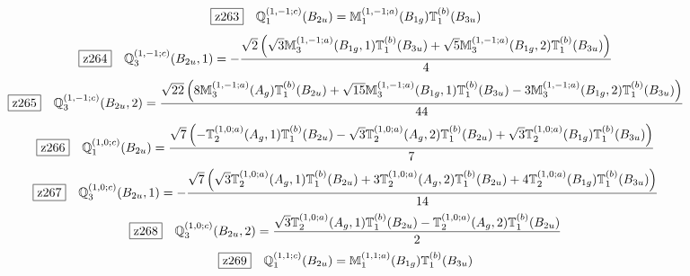 \documentclass[fleqn,10pt,landscape]{jsarticle}
\begin{document}
\begin{dmath*}
\hspace*{3mm}\fbox{z263}\quad \mathbb{Q}_{1}^{(1,-1;c)}(B_{2u})=\mathbb{M}_{1}^{(1,-1;a)}(B_{1g}) \mathbb{T}_{1}^{(b)}(B_{3u})
\end{dmath*}
\begin{dmath*}
\hspace*{3mm}\fbox{z264}\quad \mathbb{Q}_{3}^{(1,-1;c)}(B_{2u},1)=- \frac{\sqrt{2} \left(\sqrt{3} \mathbb{M}_{3}^{(1,-1;a)}(B_{1g},1) \mathbb{T}_{1}^{(b)}(B_{3u}) + \sqrt{5} \mathbb{M}_{3}^{(1,-1;a)}(B_{1g},2) \mathbb{T}_{1}^{(b)}(B_{3u})\right)}{4}
\end{dmath*}
\begin{dmath*}
\hspace*{3mm}\fbox{z265}\quad \mathbb{Q}_{3}^{(1,-1;c)}(B_{2u},2)=\frac{\sqrt{22} \left(8 \mathbb{M}_{3}^{(1,-1;a)}(A_{g}) \mathbb{T}_{1}^{(b)}(B_{2u}) + \sqrt{15} \mathbb{M}_{3}^{(1,-1;a)}(B_{1g},1) \mathbb{T}_{1}^{(b)}(B_{3u}) - 3 \mathbb{M}_{3}^{(1,-1;a)}(B_{1g},2) \mathbb{T}_{1}^{(b)}(B_{3u})\right)}{44}
\end{dmath*}
\begin{dmath*}
\hspace*{3mm}\fbox{z266}\quad \mathbb{Q}_{1}^{(1,0;c)}(B_{2u})=\frac{\sqrt{7} \left(- \mathbb{T}_{2}^{(1,0;a)}(A_{g},1) \mathbb{T}_{1}^{(b)}(B_{2u}) - \sqrt{3} \mathbb{T}_{2}^{(1,0;a)}(A_{g},2) \mathbb{T}_{1}^{(b)}(B_{2u}) + \sqrt{3} \mathbb{T}_{2}^{(1,0;a)}(B_{1g}) \mathbb{T}_{1}^{(b)}(B_{3u})\right)}{7}
\end{dmath*}
\begin{dmath*}
\hspace*{3mm}\fbox{z267}\quad \mathbb{Q}_{3}^{(1,0;c)}(B_{2u},1)=- \frac{\sqrt{7} \left(\sqrt{3} \mathbb{T}_{2}^{(1,0;a)}(A_{g},1) \mathbb{T}_{1}^{(b)}(B_{2u}) + 3 \mathbb{T}_{2}^{(1,0;a)}(A_{g},2) \mathbb{T}_{1}^{(b)}(B_{2u}) + 4 \mathbb{T}_{2}^{(1,0;a)}(B_{1g}) \mathbb{T}_{1}^{(b)}(B_{3u})\right)}{14}
\end{dmath*}
\begin{dmath*}
\hspace*{3mm}\fbox{z268}\quad \mathbb{Q}_{3}^{(1,0;c)}(B_{2u},2)=\frac{\sqrt{3} \mathbb{T}_{2}^{(1,0;a)}(A_{g},1) \mathbb{T}_{1}^{(b)}(B_{2u}) - \mathbb{T}_{2}^{(1,0;a)}(A_{g},2) \mathbb{T}_{1}^{(b)}(B_{2u})}{2}
\end{dmath*}
\begin{dmath*}
\hspace*{3mm}\fbox{z269}\quad \mathbb{Q}_{1}^{(1,1;c)}(B_{2u})=\mathbb{M}_{1}^{(1,1;a)}(B_{1g}) \mathbb{T}_{1}^{(b)}(B_{3u})
\end{dmath*}
\end{document}
